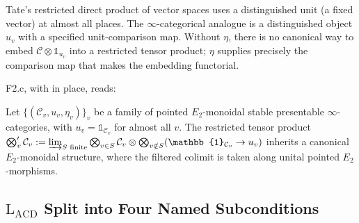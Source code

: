 \begin{remark}
\label{v4-arith:sw:rem:why-pointed}
Tate's restricted direct product of vector spaces uses a
distinguished unit (a fixed vector) at almost all places. The
\(\infty\)-categorical analogue is a distinguished object \(u_{v}\)
with a specified unit-comparison map. Without \(\eta\), there is no canonical way to embed
\(\mathcal{C}\otimes\mathbb{1}_{u_{v}}\) into a restricted tensor
product; \(\eta\) supplies precisely the comparison map that makes the
embedding functorial.
\end{remark}

F2.c, with  in place, reads:

\begin{conjecture}[F2.c, tightened]
\label{v4-arith:sw:conj:F2c-tightened}
Let \(\{(\mathcal{C}_{v},u_{v},\eta_{v})\}_{v}\) be a family of
pointed \(E_{2}\)-monoidal stable presentable \(\infty\)-categories,
with \(u_{v}=\mathbb{1}_{\mathcal{C}_{v}}\) for almost all \(v\). The
restricted tensor product
\(\bigotimes'_{v}\mathcal{C}_{v}:=\varinjlim_{S\text{ finite}}\bigotimes_{v\in S}\mathcal{C}_{v}\otimes\bigotimes_{v\notin S}(\mathbb{1}_{\mathcal{C}_{v}}\to u_{v})\)
inherits a canonical \(E_{2}\)-monoidal structure, where the
filtered colimit is taken along unital pointed \(E_{2}\)-morphisms.
\end{conjecture}

\subsection{\texorpdfstring{\(\mathrm{L}_{\mathrm{ACD}}\)}{L-ACD} Split into Four Named Subconditions}

